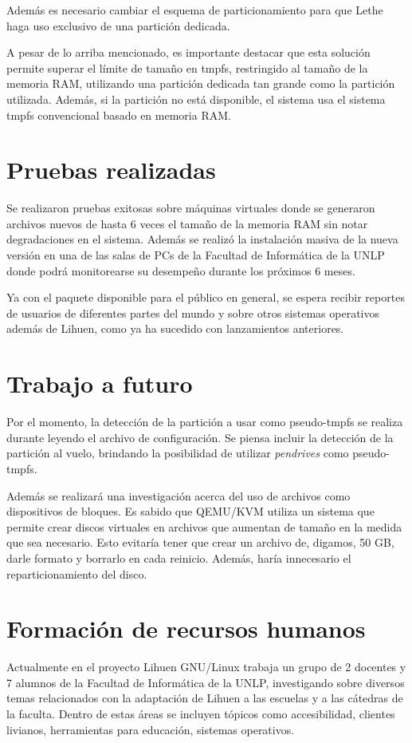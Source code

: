\documentclass[final,narroweqnarray,inline,twoside]{ieee}
\begin{document}
Además es necesario cambiar el esquema de particionamiento para que Lethe haga uso exclusivo de una partición dedicada.

A pesar de lo arriba mencionado, es importante destacar que esta solución permite superar el límite de tamaño en tmpfs,
restringido al tamaño de la memoria RAM, utilizando una partición
dedicada tan grande como la partición utilizada. Además, si la partición no está disponible, el sistema usa el sistema tmpfs
convencional basado en memoria RAM.

\section{Pruebas realizadas}
Se realizaron pruebas exitosas sobre máquinas virtuales donde se generaron archivos nuevos de hasta 6 veces el tamaño de la
memoria RAM sin notar degradaciones en el sistema. Además se realizó la instalación masiva de la nueva versión en una de las
salas de PCs de la Facultad de Informática de la UNLP donde podrá monitorearse su desempeño durante los próximos 6
meses.

Ya con el paquete disponible para el público en general, se espera recibir reportes de usuarios de diferentes partes del
mundo y sobre otros sistemas operativos además de Lihuen, como ya ha sucedido con lanzamientos anteriores.

\section{Trabajo a futuro}
Por el momento, la detección de la partición a usar como pseudo-tmpfs se realiza durante leyendo el archivo de
configuración. Se piensa incluir la detección de la partición al vuelo, brindando la posibilidad de utilizar
\textit{pendrives} como pseudo-tmpfs.

Además se realizará una investigación acerca del uso de archivos como dispositivos de bloques. Es sabido que QEMU/KVM utiliza
un sistema que permite crear discos virtuales en archivos que aumentan de tamaño en la medida que sea necesario. Esto
evitaría tener que crear un archivo de, digamos, 50 GB, darle formato y borrarlo en cada reinicio. Además, haría innecesario
el reparticionamiento del disco.

\section{Formación de recursos humanos}
Actualmente en el proyecto Lihuen GNU/Linux trabaja un grupo de 2 docentes y 7 alumnos de la Facultad de Informática de la
UNLP, investigando sobre diversos temas relacionados con la adaptación de Lihuen a las escuelas y a las cátedras de la
faculta. Dentro de estas áreas se incluyen tópicos como accesibilidad, clientes livianos, herramientas para educación,
sistemas operativos. 
\end{document}
